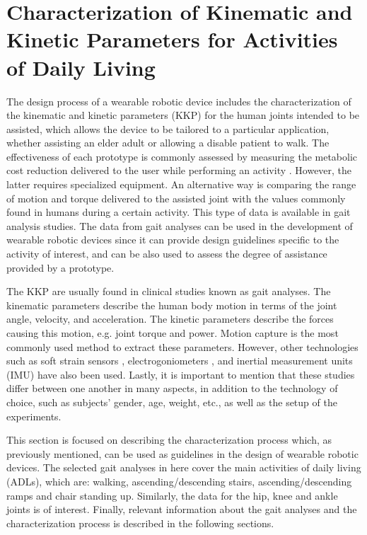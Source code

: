 \section{Characterization of Kinematic and Kinetic Parameters for Activities of Daily Living}
\label{sec:characterizationKKP}

The design process of a wearable robotic device includes the characterization of the kinematic and kinetic parameters (KKP) for the human joints intended to be assisted, which allows the device to be tailored to a particular application, whether assisting an elder adult or allowing a disable patient to walk. The effectiveness of each prototype is commonly assessed by measuring the metabolic cost reduction delivered to the user while performing an activity \cite{panizzolo2016biologically}. However, the latter requires specialized equipment. An alternative way is comparing the range of motion and torque delivered to the assisted joint with the values commonly found in humans during a certain activity. This type of data is available in gait analysis studies. The data from gait analyses can be used in the development of wearable robotic devices since it can provide design guidelines specific to the activity of interest, and can be also used to assess the degree of assistance provided by a prototype.

The KKP are usually found in clinical studies known as gait analyses. The kinematic parameters describe the human body motion in terms of the joint angle, velocity, and acceleration. The kinetic
parameters describe the forces causing this motion, e.g. joint torque and power. Motion capture is the most commonly used method to extract these parameters. However, other technologies such as soft strain sensors \cite{mengucc2014wearable}, electrogoniometers \cite{wu2011electromyography}, and inertial measurement units (IMU) have also been used. Lastly, it is important to mention that these studies differ between one another in many aspects, in addition to the technology of choice, such as subjects' gender, age, weight, etc., as well as the setup of the experiments.

This section is focused on describing the characterization process which, as previously mentioned, can be used as guidelines in the design of wearable robotic devices. The selected gait analyses in here cover the main activities of daily living (ADLs), which are: walking, ascending/descending stairs, ascending/descending ramps and chair standing up. Similarly, the data for the hip, knee and ankle joints is of interest. Finally, relevant information about the gait analyses and the characterization process is described in the following sections.

